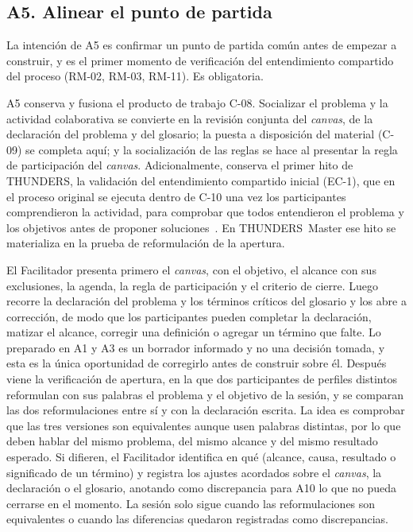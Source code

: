 \documentclass[12pt,letterpaper,oneside]{report}
\begin{document}
\subsection{A5. Alinear el punto de partida}
La intención de A5 es confirmar un punto de partida común antes de empezar a
construir, y es el primer momento de verificación del entendimiento compartido
del proceso (RM-02, RM-03, RM-11). Es obligatoria.

A5 conserva y fusiona el producto de trabajo C-08. Socializar el problema y la actividad
colaborativa se convierte en la revisión conjunta del \textit{canvas}, de la
declaración del problema y del glosario; la puesta a disposición del material
(C-09) se completa aquí; y la socialización de las reglas se hace al presentar
la regla de participación del \textit{canvas}. Adicionalmente, conserva el
primer hito de THUNDERS, la validación del entendimiento compartido inicial
(EC-1), que en el proceso original se ejecuta dentro de C-10 una vez los
participantes comprendieron la actividad, para comprobar que todos entendieron
el problema y los objetivos antes de proponer soluciones~\cite{agredo2022thesis}.
En THUNDERS~Master ese hito se materializa en la prueba de reformulación de la
apertura.

El Facilitador presenta primero el \textit{canvas}, con el objetivo, el alcance
con sus exclusiones, la agenda, la regla de participación y el criterio de
cierre. Luego recorre
la declaración del problema y los términos críticos del glosario y los abre a
corrección, de modo que los participantes pueden completar la declaración,
matizar el alcance, corregir una definición o agregar un término que falte. Lo
preparado en A1 y A3 es un borrador informado y no una decisión tomada, y esta
es la única oportunidad de corregirlo antes de construir sobre él. Después viene
la verificación de apertura, en la que dos participantes de perfiles distintos
reformulan con sus palabras el problema y el objetivo de la sesión, y se
comparan las dos reformulaciones entre sí y con la declaración escrita. La idea
es comprobar que las tres versiones son equivalentes aunque usen palabras
distintas, por lo que deben hablar del mismo problema, del mismo alcance y del
mismo resultado esperado. Si difieren, el Facilitador identifica en qué
(alcance, causa, resultado o significado de un término) y registra los ajustes
acordados sobre el \textit{canvas}, la declaración o el glosario, anotando como
discrepancia para A10 lo que no pueda cerrarse en el momento. La sesión solo
sigue cuando las reformulaciones son equivalentes o cuando las diferencias
quedaron registradas como discrepancias.
\end{document}
